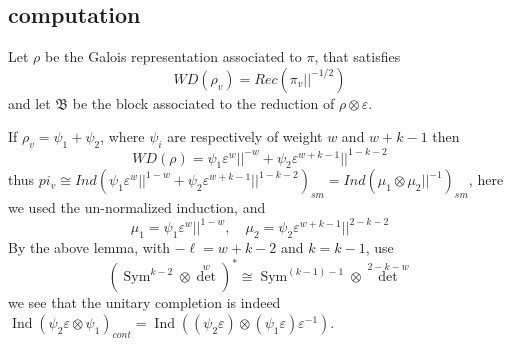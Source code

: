\documentclass[leqno]{amsart}
\DeclareMathOperator{\Sym}{Sym}
\newcommand{\1}{\mathbf{1}}
\newcommand{\B}{\mathfrak B}
\DeclareMathOperator{\Ind}{Ind}
\theoremstyle{definition}
\theoremstyle{remark}
\begin{document}
\subsection{computation}

Let $\rho$ be the Galois representation
associated to  $\pi$, that satisfies
 \[
	WD(\rho_v)=Rec(\pi_v||^{-1/2})
\]
and let $\B$ be the block associated to the reduction
of  $\rho\otimes\varepsilon$.

If $\rho_v=\psi_1+\psi_2$,
where $\psi_i$ are respectively of weight
$w$ and  $w+k-1$
then 
\[
	WD(\rho)=\psi_1\varepsilon^w||^{-w}+
	\psi_2\varepsilon^{w+k-1}||^{1-k-2}
\]
thus $pi_v\cong Ind( \psi_1\varepsilon^w||^{1-w}+
\psi_2\varepsilon^{w+k-1}||^{1-k-2})_{sm}
=Ind(\mu_1\otimes\mu_2||^{-1})_{sm}$,
here we used the un-normalized induction, and
\[
	\mu_1=\psi_1\varepsilon^{w}||^{1-w},\quad
	\mu_2=\psi_2\varepsilon^{w+k-1}||^{2-k-2}
\]
By the above lemma, with $-\ell=w+k-2$ and  $k=k-1$,
use
 \[
	 (\Sym^{k-2}\otimes\det^w)^*\cong 
	 \Sym^{(k-1)-1}\otimes\det^{2-k-w}
\]
we see that the unitary completion is 
indeed 
$\Ind(\psi_2\varepsilon\otimes\psi_1)_{cont}=
\Ind((\psi_2\varepsilon)\otimes(\psi_1\varepsilon)\varepsilon^{-1})$.




\end{document}
